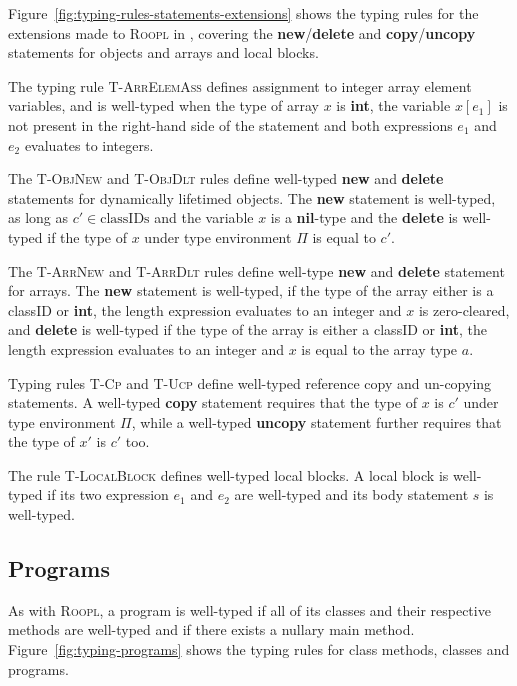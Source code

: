 Figure~\ref{fig:typing-rules-statements-extensions} shows the typing rules for the extensions made to \textsc{Roopl} in \rooplpp, covering the \textbf{new}/\textbf{delete} and \textbf{copy}/\textbf{uncopy} statements for objects and arrays and local blocks.

The typing rule \textsc{T-ArrElemAss} defines assignment to integer array element variables, and is well-typed when the type of array $x$ is \textbf{int}, the variable $x[e_1]$ is not present in the right-hand side of the statement and both expressions $e_1$ and $e_2$ evaluates to integers.

The \textsc{T-ObjNew} and \textsc{T-ObjDlt} rules define well-typed \textbf{new} and \textbf{delete} statements for dynamically lifetimed objects. The \textbf{new} statement is well-typed, as long as $c' \in \text{classIDs}$ and the variable $x$ is a \textbf{nil}-type and the \textbf{delete} is well-typed if the type of $x$ under type environment $\Pi$ is equal to $c'$.

The \textsc{T-ArrNew} and \textsc{T-ArrDlt} rules define well-type \textbf{new} and \textbf{delete} statement for \rooplpp arrays. The \textbf{new} statement is well-typed, if the type of the array either is a classID or \textbf{int}, the length expression evaluates to an integer and $x$ is zero-cleared, and \textbf{delete} is well-typed if the type of the array is either a classID or \textbf{int}, the length expression evaluates to an integer and $x$ is equal to the array type $a$.

Typing rules \textsc{T-Cp} and \textsc{T-Ucp} define well-typed reference copy and un-copying statements. A well-typed \textbf{copy} statement requires that the type of $x$ is $c'$ under type environment $\Pi$, while a well-typed \textbf{uncopy} statement further requires that the type of $x'$ is $c'$ too.

The rule \textsc{T-LocalBlock} defines well-typed local blocks. A local block is well-typed if its two expression $e_1$ and $e_2$ are well-typed and its body statement $s$ is well-typed. 

\subsection{Programs}
\label{subsec:programs} 
As with \textsc{Roopl}, a \rooplpp program is well-typed if all of its classes and their respective methods are well-typed and if there exists a nullary main method. Figure~\ref{fig:typing-programs} shows the typing rules for class methods, classes and programs.

